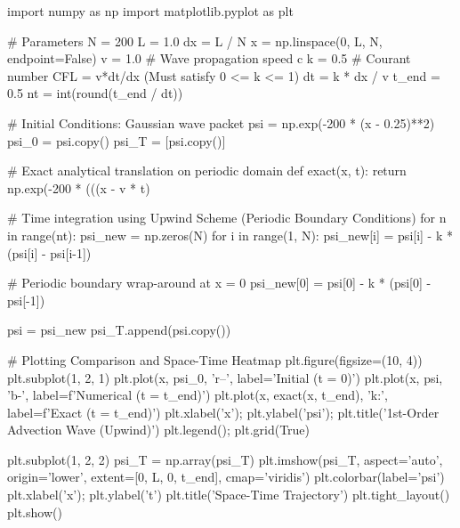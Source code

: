 \documentclass{article}
\begin{document}
\begin{jupytercode}
import numpy as np 
import matplotlib.pyplot as plt

# Parameters
N = 200
L = 1.0
dx = L / N
x = np.linspace(0, L, N, endpoint=False)
v = 1.0                 # Wave propagation speed c
k = 0.5                 # Courant number CFL = v*dt/dx (Must satisfy 0 <= k <= 1)
dt = k * dx / v
t_end = 0.5
nt = int(round(t_end / dt))

# Initial Conditions: Gaussian wave packet
psi = np.exp(-200 * (x - 0.25)**2)
psi_0 = psi.copy()
psi_T = [psi.copy()]

# Exact analytical translation on periodic domain
def exact(x, t):
    return np.exp(-200 * (((x - v * t) %

# Time integration using Upwind Scheme (Periodic Boundary Conditions)
for n in range(nt):
    psi_new = np.zeros(N)
    for i in range(1, N):
        psi_new[i] = psi[i] - k * (psi[i] - psi[i-1])
        
    # Periodic boundary wrap-around at x = 0
    psi_new[0] = psi[0] - k * (psi[0] - psi[-1])
    
    psi = psi_new
    psi_T.append(psi.copy())

# Plotting Comparison and Space-Time Heatmap
plt.figure(figsize=(10, 4))
plt.subplot(1, 2, 1)
plt.plot(x, psi_0, 'r--', label='Initial (t = 0)')
plt.plot(x, psi, 'b-', label=f'Numerical (t = {t_end})')
plt.plot(x, exact(x, t_end), 'k:', label=f'Exact (t = {t_end})')
plt.xlabel('x'); plt.ylabel('psi'); plt.title('1st-Order Advection Wave (Upwind)')
plt.legend(); plt.grid(True)

plt.subplot(1, 2, 2)
psi_T = np.array(psi_T)
plt.imshow(psi_T, aspect='auto', origin='lower',
           extent=[0, L, 0, t_end], cmap='viridis')
plt.colorbar(label='psi')
plt.xlabel('x'); plt.ylabel('t')
plt.title('Space-Time Trajectory')
plt.tight_layout()
plt.show()
\end{jupytercode}
\newpage
\end{document}
